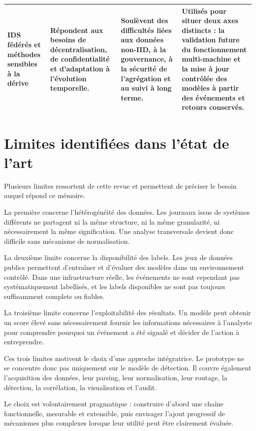 \begin{table}[H]
\begin{tabularx}{\textwidth}{p{2.8cm}p{3.5cm}p{3.5cm}X}
IDS fédérés et méthodes sensibles à la dérive &
Répondent aux besoins de décentralisation, de confidentialité et d'adaptation à l'évolution temporelle. &
Soulèvent des difficultés liées aux données non-IID, à la gouvernance, à la sécurité de l'agrégation et au suivi à long terme. &
Utilisés pour situer deux axes distincts : la validation future du fonctionnement multi-machine et la mise à jour contrôlée des modèles à partir des événements et retours conservés. \\

\bottomrule
\end{tabularx}
\end{table}

\section{Limites identifiées dans l'état de l'art}

Plusieurs limites ressortent de cette revue et permettent de préciser le besoin auquel répond ce mémoire.

La première concerne l'hétérogénéité des données. Les journaux issus de systèmes différents ne partagent ni la même structure, ni la même granularité, ni nécessairement la même signification. Une analyse transversale devient donc difficile sans mécanisme de normalisation.

La deuxième limite concerne la disponibilité des labels. Les jeux de données publics permettent d'entraîner et d'évaluer des modèles dans un environnement contrôlé. Dans une infrastructure réelle, les événements ne sont cependant pas systématiquement labellisés, et les labels disponibles ne sont pas toujours suffisamment complets ou fiables.

La troisième limite concerne l'exploitabilité des résultats. Un modèle peut obtenir un score élevé sans nécessairement fournir les informations nécessaires à l'analyste pour comprendre pourquoi un événement a été signalé et décider de l'action à entreprendre.

Ces trois limites motivent le choix d'une approche intégratrice. Le prototype ne se concentre donc pas uniquement sur le modèle de détection. Il couvre également l'acquisition des données, leur parsing, leur normalisation, leur routage, la détection, la corrélation, la visualisation et l'audit.

Le choix est volontairement pragmatique : construire d'abord une chaîne fonctionnelle, mesurable et extensible, puis envisager l'ajout progressif de mécanismes plus complexes lorsque leur utilité peut être clairement évaluée.

